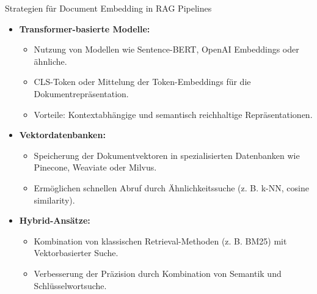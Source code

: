 \documentclass[aspectratio=1610, xcolor=dvipsnames, 9pt]{beamer}
\begin{document}
\begin{frame}{Strategien für Document Embedding in RAG Pipelines}
  \begin{itemize}
    \item \textbf{Transformer-basierte Modelle:}
      \begin{itemize}
        \item Nutzung von Modellen wie Sentence-BERT, OpenAI Embeddings oder ähnliche.
        \item CLS-Token oder Mittelung der Token-Embeddings für die Dokumentrepräsentation.
        \item Vorteile: Kontextabhängige und semantisch reichhaltige Repräsentationen.
      \end{itemize}
    \item \textbf{Vektordatenbanken:}
      \begin{itemize}
        \item Speicherung der Dokumentvektoren in spezialisierten Datenbanken wie Pinecone, Weaviate oder Milvus.
        \item Ermöglichen schnellen Abruf durch Ähnlichkeitssuche (z. B. k-NN, cosine similarity).
      \end{itemize}
    \item \textbf{Hybrid-Ansätze:}
      \begin{itemize}
        \item Kombination von klassischen Retrieval-Methoden (z. B. BM25) mit Vektorbasierter Suche.
        \item Verbesserung der Präzision durch Kombination von Semantik und Schlüsselwortsuche.
      \end{itemize}
  \end{itemize}
\end{frame}
\end{document}
